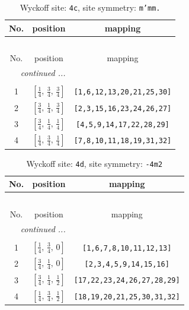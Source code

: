 \documentclass[fleqn,8pt]{jsarticle}
\begin{document}
\renewcommand{\arraystretch}{1.2}
\begin{longtable}{ccc}
\caption{Wyckoff site: {\tt 4c}, site symmetry: {\tt m'mm.}}
 \\
 \hline \hline
No. & position & mapping \\ \hline \endfirsthead

\multicolumn{2}{l}{\tablename\ \thetable{}} \\
 \hline \hline
No. & position & mapping \\ \hline \endhead

 \hline \hline
\multicolumn{2}{r}{\footnotesize\it continued ...} \\ \endfoot

 \hline \hline
\multicolumn{2}{r}{} \\ \endlastfoot

1 & $\left[ \frac{1}{4},\, \frac{3}{4},\, \frac{3}{4} \right]$ & {\tt [1,6,12,13,20,21,25,30]} \\ \hline
2 & $\left[ \frac{3}{4},\, \frac{1}{4},\, \frac{3}{4} \right]$ & {\tt [2,3,15,16,23,24,26,27]} \\ \hline
3 & $\left[ \frac{3}{4},\, \frac{1}{4},\, \frac{1}{4} \right]$ & {\tt [4,5,9,14,17,22,28,29]} \\ \hline
4 & $\left[ \frac{1}{4},\, \frac{3}{4},\, \frac{1}{4} \right]$ & {\tt [7,8,10,11,18,19,31,32]} \\
\end{longtable}
\renewcommand{\arraystretch}{1.2}
\begin{longtable}{ccc}
\caption{Wyckoff site: {\tt 4d}, site symmetry: {\tt -4m2}}
 \\
 \hline \hline
No. & position & mapping \\ \hline \endfirsthead

\multicolumn{2}{l}{\tablename\ \thetable{}} \\
 \hline \hline
No. & position & mapping \\ \hline \endhead

 \hline \hline
\multicolumn{2}{r}{\footnotesize\it continued ...} \\ \endfoot

 \hline \hline
\multicolumn{2}{r}{} \\ \endlastfoot

1 & $\left[ \frac{1}{4},\, \frac{3}{4},\, 0 \right]$ & {\tt [1,6,7,8,10,11,12,13]} \\ \hline
2 & $\left[ \frac{3}{4},\, \frac{1}{4},\, 0 \right]$ & {\tt [2,3,4,5,9,14,15,16]} \\ \hline
3 & $\left[ \frac{3}{4},\, \frac{1}{4},\, \frac{1}{2} \right]$ & {\tt [17,22,23,24,26,27,28,29]} \\ \hline
4 & $\left[ \frac{1}{4},\, \frac{3}{4},\, \frac{1}{2} \right]$ & {\tt [18,19,20,21,25,30,31,32]} \\
\end{longtable}
\end{document}
